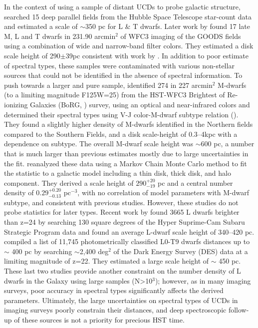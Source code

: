 \documentclass[manuscript]{aastex}
\begin{document}
In the context of using a sample of distant UCDs to probe galactic structure, \cite{2005ApJ...631L.159R} searched 15 deep parallel fields from the Hubble Space Telescope star-count data and estimated a scale of $\sim$350 pc for L \& T dwarfs. Later work by \cite{Ryan2011} found 17 late M, L and T dwarfs in 231.90 arcmin$^2$ of WFC3 imaging of the GOODS fields using a combination of wide and narrow-band filter colors. They estimated a disk scale height of 290$\pm$39pc consistent with work by \cite{2005ApJ...622..319P}. In addition to poor estimate of spectral types, these samples were contaminated with various non-stellar sources that could not be identified in the absence of spectral information. To push towards a larger and pure sample, \cite{Holwerda2014} identified  274 in 227 arcmin$^2$ M-dwarfs (to a limiting magnitude F125W=25) from the HST-WFC3 Brightest of Re-ionizing Galaxies (BoRG, \citealt{2009ApJ...695.1591P}) survey, using an optical and near-infrared colors and determined their spectral types using V-J color-M-dwarf subtype relation (\citealt{2009ApJ...695.1591P}). They found a slightly higher density of M-dwarfs identified in the Northern fields compared to the Southern Fields, and a  disk scale-height of 0.3--4kpc with a dependence on subtype. The overall M-dwarf scale height was $\sim$600 pc, a number that is much larger than previous estimates mostly due to large uncertainties in the fit. \cite{Vledder2016} reanalyzed these data using a Markov Chain Monte Carlo method to fit the statistic to a galactic model including a thin disk, thick disk, and halo component. They derived a scale height of $290^{+20}_{-19}$ pc and a central number density of $0.29^{+0.20}_{-0.13}$ pc$^{-3}$, with no correlation of model parameters with M-dwarf subtype, and consistent with previous studies. However, these studies do not probe statistics for later types. Recent work by \cite{Sorahana2018} found 3665 L dwarfs brighter than z=24 by searching 130 square degrees of the Hyper Suprime-Cam Subaru Strategic Program data and found an average L-dwarf scale height of 340--420 pc. \cite{2019arXiv190310806C} compiled a list of 11,745 photometrically classified L0-T9 dwarfs distances up to $\sim$ 400 pc by searching $\sim$2,400 deg$^2$ of the Dark Energy Survey (DES) data at a limiting magnitude of z=22. They estimated a large scale height of $\sim$ 450 pc. These last two studies provide another constraint on the number density of L dwarfs in the Galaxy using large samples (N\textgreater 10$^3$); however, as in many imaging surveys, poor accuracy in spectral types significantly affects the derived parameters. Ultimately, the large uncertainties on spectral types  of UCDs in imaging surveys poorly constrain their distances, and deep spectroscopic follow-up of these sources is not a priority for precious HST time. 
\end{document}

